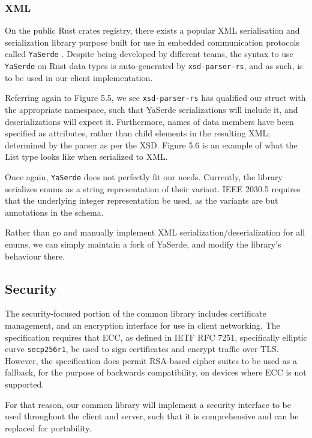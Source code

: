 \subsubsection{XML}

On the public Rust crates registry, there exists a popular XML serialisation and serialization library purpose built for use in embedded communication protocols called \texttt{YaSerde} \cite[]{YaSerde}.
Despite being developed by different teams, the syntax to use \texttt{YaSerde} on Rust data types is auto-generated by \texttt{xsd-parser-rs}, and as such, is to be used in our client implementation.

Referring again to Figure 5.5, we see \texttt{xsd-parser-rs} has qualified our struct with the appropriate namespace, such that YaSerde serializations will include it, and deserializations will expect it.
Furthermore, names of data members have been specified as attributes, rather than child elements in the resulting XML; determined by the parser as per the XSD.
Figure 5.6 is an example of what the List type looks like when serialized to XML.

Once again, \texttt{YaSerde} does not perfectly fit our needs. Currently, the library serializes enums as a string representation of their variant. IEEE 2030.5 requires that the underlying integer representation be used, as the variants are but annotations in the schema.

Rather than go and manually implement XML serialization/deserialization for all enums, we can simply maintain a fork of YaSerde, and modify the library's behaviour there.


\subsection{Security}
The security-focused portion of the common library includes certificate management, and an encryption interface for use in client networking.
The specification requires that ECC, as defined in IETF RFC 7251, specifically elliptic curve \texttt{secp256r1}, be used to sign certificates and encrypt traffic over TLS.
However, the specification does permit RSA-based cipher suites to be used as a fallback, for the purpose of backwards compatibility, on devices where ECC is not supported.

For that reason, our common library will implement a security interface to be used throughout the client and server, such that it is comprehensive and can be replaced for portability.

